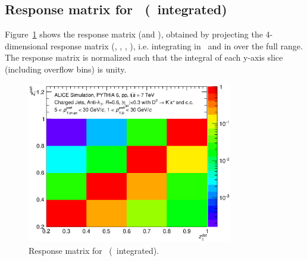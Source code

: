 \subsection{Response matrix for \zpar\ (\ptchjetgen\ integrated)}
Figure~\ref{fig:D0_Full_R060_ResponseMatrix_Z_JetPt_5_30_DPt_01_30_Norm} shows the response matrix (\zpargen and \zpardet), obtained by
projecting the 4-dimensional response matrix (\zpargen, \ptchjetgen, \zpardet, \ptchjetdet), i.e. integrating in \ptchjetgen\ and in  \ptchjetdet over the
full range.
The response matrix is normalized such that the integral of each y-axis slice (including overflow bins) is unity.
\begin{figure}[tbh]
\begin{center}
\includegraphics[width=0.8\textwidth]{img/D0_Full_R060_ResponseMatrix_Z_JetPt_5_30_DPt_01_30_Norm}
 \caption{Response matrix for \zpar\ (\ptchjetgen\ integrated).} 
 \label{fig:D0_Full_R060_ResponseMatrix_Z_JetPt_5_30_DPt_01_30_Norm}
\end{center}
\end{figure}
